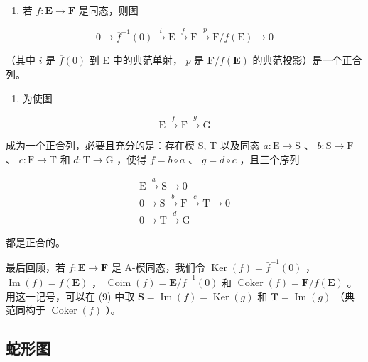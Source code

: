 \begin{enumerate}
\def\labelenumi{(\alph{enumi})}
\setcounter{enumi}{4}
\tightlist
\item
  若 \(f: \mathbf{E} \to \mathbf{F}\) 是同态，则图
\end{enumerate}

\[
0 \longrightarrow \overline {{f}} ^ {- 1} (0) \stackrel {i} {\longrightarrow} \mathrm{E} \stackrel {f} {\longrightarrow} \mathrm{F} \stackrel {p} {\longrightarrow} \mathrm{F} / f (\mathrm{E}) \longrightarrow 0\tag{7}
\]

（其中 \(i\) 是 \(\overline{f}(0)\) 到 E 中的典范单射， \(p\) 是 \(\mathbf{F} / f(\mathbf{E})\) 的典范投影）是一个正合列。

\begin{enumerate}
\def\labelenumi{(\alph{enumi})}
\setcounter{enumi}{5}
\tightlist
\item
  为使图
\end{enumerate}

\[
\mathrm{E} \xrightarrow {f} \mathrm{F} \xrightarrow {g} \mathrm{G}\tag{8}
\]

成为一个正合列，必要且充分的是：存在模 S, T 以及同态 \(a: \mathrm{E} \to \mathrm{S}\) 、 \(b: \mathrm{S} \to \mathrm{F}\) 、 \(c: \mathrm{F} \to \mathrm{T}\) 和 \(d: \mathrm{T} \to \mathrm{G}\) ，使得 \(f = b \circ a\) 、 \(g = d \circ c\) ，且三个序列

\[
\begin{array}{c} \mathrm{E} \xrightarrow {a} \mathrm{S} \longrightarrow 0 \\ 0 \longrightarrow \mathrm{S} \xrightarrow {b} \mathrm{F} \xrightarrow {c} \mathrm{T} \longrightarrow 0 \\ 0 \longrightarrow \mathrm{T} \xrightarrow {d} \mathrm{G} \end{array}\tag{9}
\]

都是正合的。

最后回顾，若 \(f: \mathbf{E} \to \mathbf{F}\) 是 A-模同态，我们令 \(\operatorname{Ker}(f) = \bar{f}^{-1}(0)\) ， \(\operatorname{Im}(f) = f(\mathbf{E})\) ， \(\operatorname{Coim}(f) = \mathbf{E} / \bar{f}^{-1}(0)\) 和 \(\operatorname{Coker}(f) = \mathbf{F} / f(\mathbf{E})\) 。用这一记号，可以在 (9) 中取 \(\mathbf{S} = \operatorname{Im}(f) = \operatorname{Ker}(g)\) 和 \(\mathbf{T} = \operatorname{Im}(g)\) （典范同构于 \(\operatorname{Coker}(f)\) ）。

\subsection{蛇形图}

